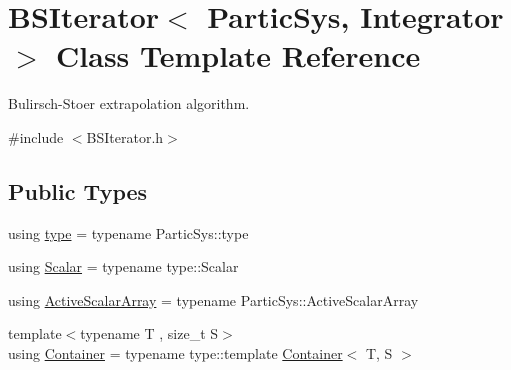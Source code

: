 \hypertarget{class_b_s_iterator}{}\section{B\+S\+Iterator$<$ Partic\+Sys, Integrator $>$ Class Template Reference}
\label{class_b_s_iterator}


Bulirsch-\/\+Stoer extrapolation algorithm.  




{\ttfamily \#include $<$B\+S\+Iterator.\+h$>$}

\subsection*{Public Types}
\begin{DoxyCompactItemize}
\item 
using \mbox{\hyperlink{class_b_s_iterator_a19530085797de211565a566f581f20ca}{type}} = typename Partic\+Sys\+::type
\item 
using \mbox{\hyperlink{class_b_s_iterator_a44773ad0f46d97005c8e21fa7c155c6f}{Scalar}} = typename type\+::\+Scalar
\item 
using \mbox{\hyperlink{class_b_s_iterator_af31c4a9064840d867fb41f3b4a7b2a6e}{Active\+Scalar\+Array}} = typename Partic\+Sys\+::\+Active\+Scalar\+Array
\item 
{\footnotesize template$<$typename T , size\+\_\+t S$>$ }\\using \mbox{\hyperlink{class_b_s_iterator_a1cb5a9b8f7ff3746a15007780c9a7b87}{Container}} = typename type\+::template \mbox{\hyperlink{class_b_s_iterator_a1cb5a9b8f7ff3746a15007780c9a7b87}{Container}}$<$ T, S $>$
\end{DoxyCompactItemize}
